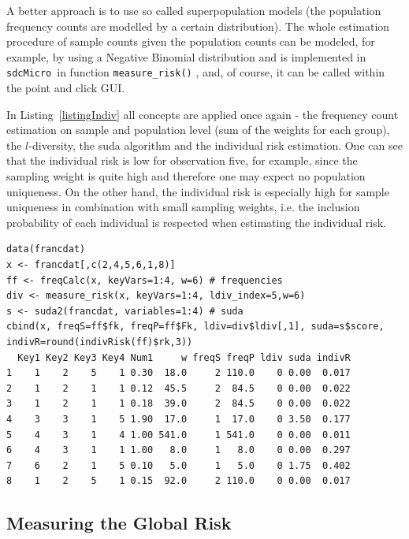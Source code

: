 \documentclass[12pt]{article}
\newcommand{\sdcMicro}{\texttt{sdcMicro}}
\begin{document}
A better approach is to use so called superpopulation models  
 (the population frequency counts are modelled by 
 a certain distribution). 
 The whole estimation procedure of sample counts given the population counts can be modeled, 
 for example, by using a 
 Negative Binomial distribution \citep[see, e.g.,][]{Rinott06} and is implemented 
 in \sdcMicro~in function \lstinline{measure_risk()} %
 \citep[for details, see][]{templ11book}, and, of course, it can be called within the 
 point and click GUI. 

In Listing~\ref{listingIndiv} all concepts are applied once again - the frequency count estimation on 
sample and population level (sum of the weights for each group), the $l$-diversity, 
the suda algorithm and the individual risk estimation. One can see that the individual risk is low 
for observation five, for example, since the sampling weight is quite high and therefore one may expect 
no population uniqueness. On the other hand, the individual risk is especially high for sample uniqueness in combination with
small sampling weights, i.e. the inclusion probability of each individual is respected when estimating the
individual risk.

\begin{lstlisting}[captionpos=b, caption={Estimating the risk.}, label=listingIndiv]
data(francdat)
x <- francdat[,c(2,4,5,6,1,8)]
ff <- freqCalc(x, keyVars=1:4, w=6) # frequencies
div <- measure_risk(x, keyVars=1:4, ldiv_index=5,w=6)
s <- suda2(francdat, variables=1:4) # suda
cbind(x, freqS=ff$fk, freqP=ff$Fk, ldiv=div$ldiv[,1], suda=s$score, indivR=round(indivRisk(ff)$rk,3))
  Key1 Key2 Key3 Key4 Num1     w freqS freqP ldiv suda indivR
1    1    2    5    1 0.30  18.0     2 110.0    0 0.00  0.017
2    1    2    1    1 0.12  45.5     2  84.5    0 0.00  0.022
3    1    2    1    1 0.18  39.0     2  84.5    0 0.00  0.022
4    3    3    1    5 1.90  17.0     1  17.0    0 3.50  0.177
5    4    3    1    4 1.00 541.0     1 541.0    0 0.00  0.011
6    4    3    1    1 1.00   8.0     1   8.0    0 0.00  0.297
7    6    2    1    5 0.10   5.0     1   5.0    0 1.75  0.402
8    1    2    5    1 0.15  92.0     2 110.0    0 0.00  0.017
\end{lstlisting}



\subsection{Measuring the Global Risk}
\end{document}
